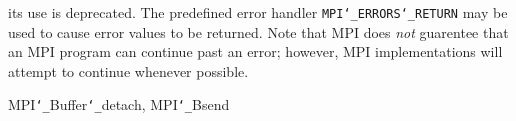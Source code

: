its use is deprecated.  The predefined error handler
{\tt MPI{\tt \char`\_}ERRORS{\tt \char`\_}RETURN} may be used to cause error values to be returned.
Note that MPI does {\em not} guarentee that an MPI program can continue past
an error; however, MPI implementations will attempt to continue whenever
possible.
\par
{}
\par
{}
 MPI{\tt \char`\_}Buffer{\tt \char`\_}detach, MPI{\tt \char`\_}Bsend
\nextline
{}
\endmanpage
